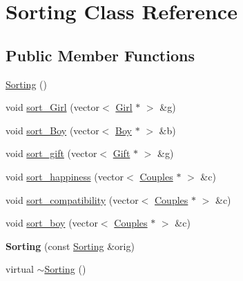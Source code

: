 \hypertarget{class_sorting}{\section{Sorting Class Reference}
\label{class_sorting}
}
\subsection*{Public Member Functions}
\begin{DoxyCompactItemize}
\item 
\hyperlink{class_sorting_a1f4eb3e52275895092a80016bdb8dd86}{Sorting} ()
\item 
void \hyperlink{class_sorting_aa52c3e1893149a9b9e7f5d5b130c46a2}{sort\-\_\-\-Girl} (vector$<$ \hyperlink{class_girl}{Girl} $\ast$ $>$ \&g)
\item 
void \hyperlink{class_sorting_aec9340e6a1c8f8fb5e3594eff105b134}{sort\-\_\-\-Boy} (vector$<$ \hyperlink{class_boy}{Boy} $\ast$ $>$ \&b)
\item 
void \hyperlink{class_sorting_a3baf77bdbf5dc1d1714793272ead3501}{sort\-\_\-gift} (vector$<$ \hyperlink{class_gift}{Gift} $\ast$ $>$ \&g)
\item 
void \hyperlink{class_sorting_a1afd70fbfc6d9d896afd65ab1e892879}{sort\-\_\-happiness} (vector$<$ \hyperlink{class_couples}{Couples} $\ast$ $>$ \&c)
\item 
void \hyperlink{class_sorting_aead29e115c26213782165403fcdd9a44}{sort\-\_\-compatibility} (vector$<$ \hyperlink{class_couples}{Couples} $\ast$ $>$ \&c)
\item 
void \hyperlink{class_sorting_aec5ff672d1c2a2e429ff32176f09561f}{sort\-\_\-boy} (vector$<$ \hyperlink{class_couples}{Couples} $\ast$ $>$ \&c)
\item 
\hypertarget{class_sorting_a5e47ae4b5218e283b0322c799dde8fd3}{{\bfseries Sorting} (const \hyperlink{class_sorting}{Sorting} \&orig)}\label{class_sorting_a5e47ae4b5218e283b0322c799dde8fd3}

\item 
virtual \hyperlink{class_sorting_a093d7f95b2f3df1dd82d6718130a06ca}{$\sim$\-Sorting} ()
\end{DoxyCompactItemize}
